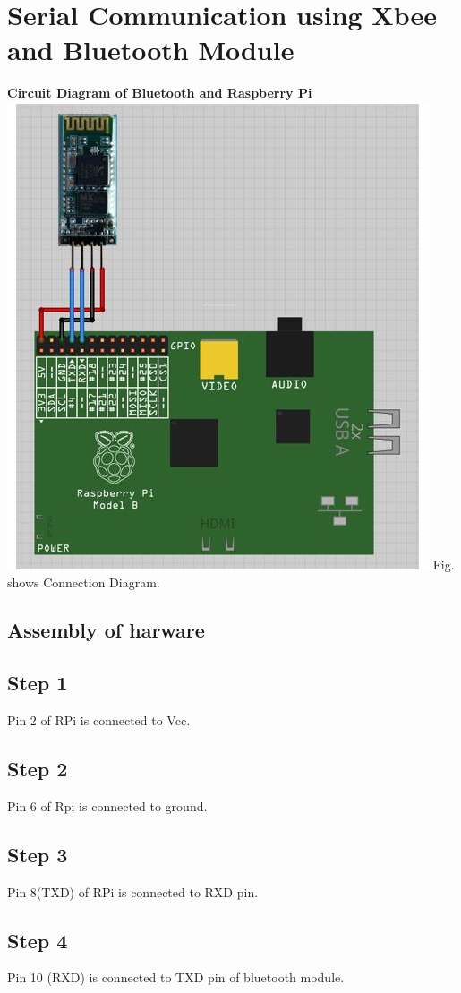 \documentclass[a4paper,12pt,oneside]{book}
\begin{document}
\section{Serial Communication using Xbee and Bluetooth Module}
\textbf{Circuit Diagram of Bluetooth and Raspberry Pi}  \\
\centering
\includegraphics[scale = 0.6]{bluetooth}
\flushleft
Fig. shows Connection Diagram.
\subsection*{Assembly of harware}
\subsection*{Step 1}
Pin 2 of RPi is connected to Vcc.
\subsection*{Step 2}
Pin 6 of Rpi is connected to ground.
\subsection*{Step 3}
Pin 8(TXD) of RPi is connected to RXD pin.
\subsection*{Step 4}
Pin 10 (RXD) is connected to TXD pin of bluetooth module.
\end{document}
